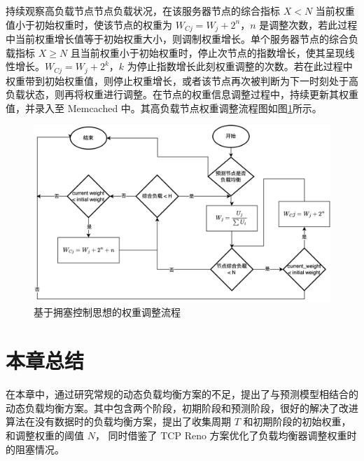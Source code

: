 持续观察高负载节点节点负载状况，在该服务器节点的综合指标 $X < N$ 当前权重值小于初始权重时，使该节点的权重为 $W_{Cj} = W_j + 2^n$，$n$ 是调整次数，若此过程中当前权重增长值等于初始权重大小，则调制权重增长。单个服务器节点的综合负载指标 $X \ge N$ 且当前权重小于初始权重时，停止次节点的指数增长，使其呈现线性增长。$W_{Cj} = W_j + 2^k$，$k$ 为停止指数增长此刻权重调整的次数。若在此过程中权重带到初始权重值，则停止权重增长，或者该节点再次被判断为下一时刻处于高负载状态，则再将权重进行调整。在节点的权重信息调整过程中，持续更新其权重值，并录入至 Memcached 中。其高负载节点权重调整流程图如图\ref{contral_weight}所示。

\begin{figure}[htbp]
  \centering
  \includegraphics[width=.9\textwidth]{figures/change_weight.png}
  \caption{基于拥塞控制思想的权重调整流程}
  \label{contral_weight}
\end{figure}

\section{本章总结}
在本章中，通过研究常规的动态负载均衡方案的不足，提出了与预测模型相结合的动态负载均衡方案。其中包含两个阶段，初期阶段和预测阶段，很好的解决了改进算法在没有数据时的负载均衡方案，提出了收集周期 $T$ 和初期阶段的初始权重，和调整权重的阈值 $N$，
同时借鉴了 TCP Reno 方案优化了负载均衡器调整权重时的阻塞情况。
